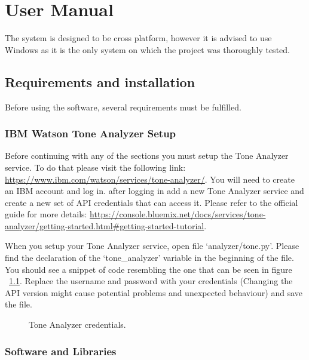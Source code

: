 \chapter{User Manual \label{chap:usermanual}}
The system is designed to be cross platform, however it is advised to use Windows as it is the only system on which the project was thoroughly tested.

\section{Requirements and installation \label{sec:requirements}}
Before using the software, several requirements must be fulfilled.

\subsection{IBM Watson Tone Analyzer Setup}
Before continuing with any of the sections you must setup the Tone Analyzer service. To do that please visit the following link: \url{https://www.ibm.com/watson/services/tone-analyzer/}. You will need to create an IBM account and log in. after logging in add a new Tone Analyzer service and create a new set of API credentials that can access it. Please refer to the official guide for more details: \url{https://console.bluemix.net/docs/services/tone-analyzer/getting-started.html#getting-started-tutorial}.

When you setup your Tone Analyzer service, open file `analyzer/tone.py'. Please find the declaration of the `tone\_analyzer' variable in the beginning of the file. You should see a snippet of code resembling the one that can be seen in figure ~\ref{fig:credentials}. Replace the username and password with your credentials (Changing the API version might cause potential problems and unexpected behaviour) and save the file.

\begin{figure}[H]
	\centerline{}
	\caption{Tone Analyzer credentials.}\label{fig:credentials}
\end{figure}


\subsection{Software and Libraries}
